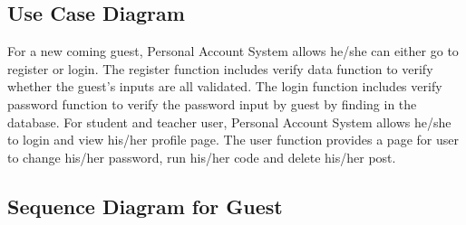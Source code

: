 \subsection{Use Case Diagram}
\begin{figure}[H]
 \label{2}
 \end{figure}
For a new coming guest, Personal Account System allows he/she can either go to register or login. The register function includes verify data function to verify whether the guest's inputs are all validated. The login function includes verify password function to verify the password input by guest by finding in the database.\newline
For student and teacher user, Personal Account System allows he/she to login and view his/her profile page. The user function provides a page for user to change his/her password, run his/her code and delete his/her post.\newline

\subsection{Sequence Diagram for Guest}
\begin{figure}[H]
 \label{3}
 \end{figure}

